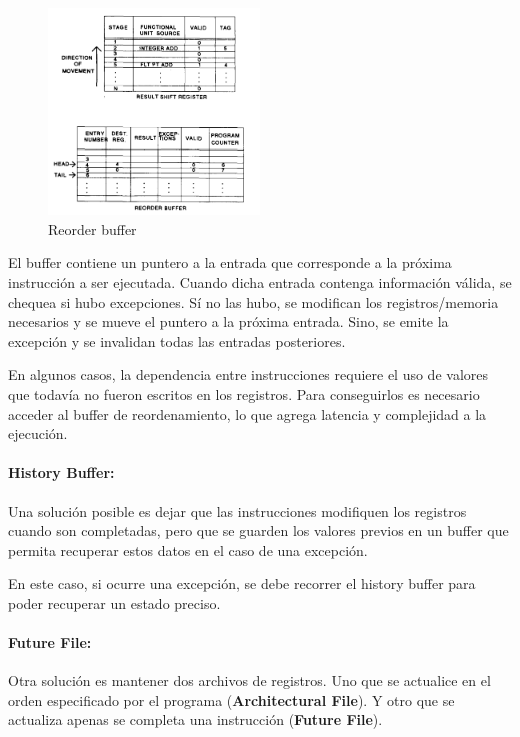\begin{figure}[ht]
	\centering
	\includegraphics[width=0.5\textwidth]{imagenes/reorder-buffer}
	\caption{Reorder buffer}
	\label{fig:reorder-buffer}
\end{figure}

El buffer contiene un puntero a la entrada que corresponde a la próxima instrucción a ser ejecutada. Cuando dicha entrada contenga información válida, se  chequea si hubo excepciones. Sí no las hubo, se modifican los registros/memoria necesarios y se mueve el puntero a la próxima entrada. Sino, se emite la excepción y se invalidan todas las entradas posteriores.

En algunos casos, la dependencia entre instrucciones requiere el uso de valores que todavía no fueron escritos en los registros. Para conseguirlos es necesario acceder al buffer de reordenamiento, lo que agrega latencia y complejidad a la ejecución.

\paragraph{History Buffer:} Una solución posible es dejar que las instrucciones modifiquen los registros cuando son completadas, pero que se guarden los valores previos en un buffer que permita recuperar estos datos en el caso de una excepción.

En este caso, si ocurre una excepción, se debe recorrer el history buffer para poder recuperar un estado preciso.

\paragraph{Future File:} Otra solución es mantener dos archivos de registros. Uno que se actualice en el orden especificado por el programa (\textbf{Architectural File}). Y otro que se actualiza apenas se completa una instrucción (\textbf{Future File}).

